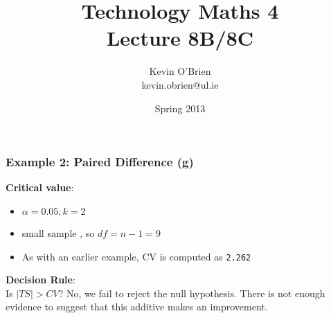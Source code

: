 \documentclass[a4]{beamer}
\title[MA4704]{Technology Maths 4 \\ {\normalsize Lecture 8B/8C}}
\author[Kevin O'Brien]{Kevin O'Brien \\ {\scriptsize kevin.obrien@ul.ie}}
\date{Spring 2013}
\institute[Maths \& Stats]{Dept. of Mathematics \& Statistics, \\ University \textit{of} Limerick}
\begin{document}
\begin{frame}
\frametitle{Example 2: Paired Difference (g)}
\textbf{Critical value}:
\begin{itemize}
\item $\alpha = 0.05, k = 2$ \item small sample , so $df = n-1 = 9$
\item As with an earlier example, CV is computed as \texttt{2.262}
\end{itemize}
\bigskip
\textbf{Decision Rule}:\\
Is $|TS| > CV$? No, we fail to reject the null hypothesis. There is not enough evidence to suggest that this additive makes an improvement.
\end{frame}
\end{document}
